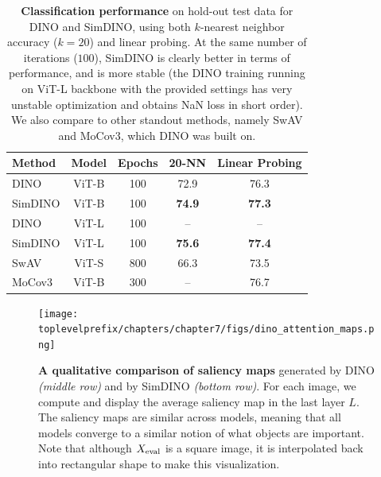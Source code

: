 \documentclass[../../book-main.tex]{subfiles}
\begin{document}
\begin{table}
    \centering
    \begin{tabular}{@{}lcccc@{}} %
        \toprule
        Method & Model & Epochs & 20-NN & Linear Probing 
        \\
        \midrule 
        DINO & ViT-B & 100 & 72.9 & 76.3 \\
        SimDINO & ViT-B & 100 & \bf 74.9 & \bf 77.3 \\
        DINO & ViT-L & 100 & -- & -- \\
        SimDINO & ViT-L & 100 & \bf 75.6 & \bf 77.4 \\
        \midrule
        \color{gray} SwAV & \color{gray} ViT-S & \color{gray} 800 & \color{gray} 66.3 & \color{gray} 73.5 \\
        \color{gray} MoCov3 & \color{gray} ViT-B & \color{gray} 300  & \color{gray} -- & \color{gray} 76.7 \\
        \bottomrule
    \end{tabular}
    \caption{\small\textbf{Classification performance} on hold-out test data for DINO and SimDINO, using both \(k\)-nearest neighbor accuracy (\(k = 20\)) and linear probing. At the same number of iterations (\(100\)), SimDINO is clearly better in terms of performance, and is more stable (the DINO training running on ViT-L backbone with the provided settings has very unstable optimization and obtains NaN loss in short order). We also compare to other standout methods, namely SwAV and MoCov3, which DINO was built on.}
    \label{tab:dino_imagenet_linear_probing}
\end{table}

\begin{figure}
    \centering 
    \texttt{[image: \\toplevelprefix/chapters/chapter7/figs/dino\_attention\_maps.png]}
    \caption{\small\textbf{A qualitative comparison of saliency maps} generated by DINO \textit{(middle row)} and by SimDINO \textit{(bottom row)}. For each image, we compute and display the average saliency map in the last layer \(L\). The saliency maps are similar across models, meaning that all models converge to a similar notion of what objects are important. Note that although \(X_{\mathrm{eval}}\) is a square image, it is interpolated back into rectangular shape to make this visualization.}
    \label{fig:dino_attention_maps_saliency}
\end{figure}
\end{document}
